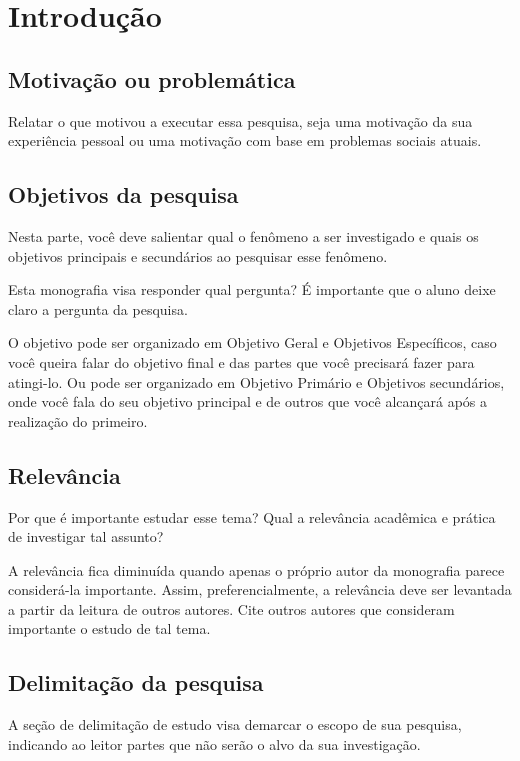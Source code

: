 \chapter{Introdução}

\section{Motivação ou problemática}

Relatar o que motivou a executar essa pesquisa, seja uma motivação da sua experiência pessoal ou uma motivação com base em problemas sociais atuais.

\section{Objetivos da pesquisa}

Nesta parte, você deve salientar qual o fenômeno a ser investigado e quais os objetivos principais e secundários ao pesquisar esse fenômeno.

Esta monografia visa responder qual pergunta? É importante que o aluno deixe claro a pergunta da pesquisa.

O objetivo pode ser organizado em Objetivo Geral e Objetivos Específicos, caso você queira falar do objetivo final e das partes que você precisará fazer para atingi-lo. Ou pode ser organizado em Objetivo Primário e Objetivos secundários, onde você fala do seu objetivo principal e de outros que você alcançará após a realização do primeiro.

\section{Relevância}

Por que é importante estudar esse tema? Qual a relevância acadêmica e prática de investigar tal assunto? 

A relevância fica diminuída quando apenas o próprio autor da monografia parece considerá-la importante. Assim, preferencialmente, a relevância deve ser levantada a partir da leitura de outros autores. Cite outros autores que consideram importante o estudo de tal tema.

\section{Delimitação da pesquisa}

A seção de delimitação de estudo visa demarcar o escopo de sua pesquisa, indicando ao leitor partes que não serão o alvo da sua investigação.


